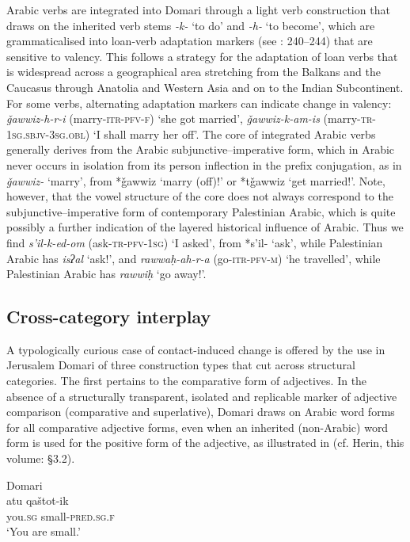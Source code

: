 \documentclass[output=paper]{langsci/langscibook}
\begin{document}
Arabic verbs are integrated into Domari through a light verb construction that draws on the inherited verb stems \textit{-k-} ‘to do’ and \textit{-h-} ‘to become’, which are grammaticalised into loan-verb adaptation markers (see \citealt{Matras2012}: 240–244) that are sensitive to valency. This follows a strategy for the adaptation of loan verbs that is widespread across a geographical area stretching from the Balkans and the Caucasus through Anatolia and Western Asia and on to the Indian Subcontinent. For some verbs, alternating adaptation markers can indicate change in valency: \textit{ǧawwiz-h-r-i} (marry-\textsc{itr-pfv-f}) ‘she got married’, \textit{ǧawwiz-k-am-is} (marry-\textsc{tr-1sg.sbjv-3sg.obl}) ‘I shall marry her off’. The core of integrated Arabic verbs generally derives from the Arabic subjunctive–imperative form, which in Arabic never occurs in isolation from its person inflection in the prefix conjugation, as in \textit{ǧawwiz-} ‘marry’, from *ǧawwiz ‘marry (off)!’ or *tǧawwiz ‘get married!’. Note, however, that the vowel structure of the core does not always correspond to the subjunctive–imperative form of contemporary Palestinian Arabic, which is quite possibly a further indication of the layered historical influence of Arabic. Thus we find \textit{s’il-k-ed-om} (ask-\textsc{tr-pfv-1sg}) ‘I asked’, from *s’il- ‘ask’, while Palestinian Arabic has \textit{isʔal} ‘ask!’, and \textit{rawwaḥ-ah-r-a} (go-\textsc{itr-pfv-m}) ‘he travelled’, while Palestinian Arabic has \textit{rawwiḥ} ‘go away!’.

\largerpage

\subsection{Cross-category interplay
}

A typologically curious case of contact-induced change is offered by the use in Jerusalem Domari of three construction types that cut across structural categories. The first pertains to the comparative form of adjectives. In the absence of a structurally transparent, isolated and replicable marker of adjective comparison (comparative and superlative), Domari draws on Arabic word forms for all comparative adjective forms, even when an inherited (non-Arabic) word form is used for the positive form of the adjective, as illustrated in  (cf. Herin, this volume: §3.2).

\ea\label{comp}
\ea
{Domari}\\
\gll atu qaštot-ik    \\
           you.\textsc{sg} small-\textsc{pred.sg.f}\\
\glt       ‘You are small.’
\end{document}
